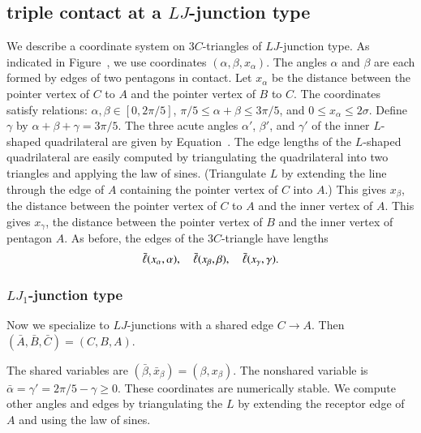 \subsection{triple contact at a $LJ$-junction type}

We describe a coordinate system on $3C$-triangles of $LJ$-junction
type.  As indicated in Figure~, we use coordinates
$(\alpha,\beta,x_\alpha)$.  The angles $\alpha$ and $\beta$ are each
formed by edges of two pentagons in contact.  Let $x_\alpha$ be the
distance between the pointer vertex of $C$ to $A$ and the pointer
vertex of $B$ to $C$.  The coordinates satisfy relations:
$\alpha,\beta\in [0,2\pi/5]$, $\pi/5\le\alpha+\beta\le 3\pi/5$, and
$0\le x_\alpha\le 2\sigma$.  Define $\gamma$ by
$\alpha+\beta+\gamma=3\pi/5$.  The three acute angles $\alpha'$,
$\beta'$, and $\gamma'$ of the inner $L$-shaped quadrilateral are
given by Equation~.  The edge lengths of the $L$-shaped
quadrilateral are easily computed by triangulating the quadrilateral
into two triangles and applying the law of sines.  (Triangulate $L$ by
extending the line through the edge of $A$ containing the pointer
vertex of $C$ into $A$.)  This gives $x_\beta$, the distance between
the pointer vertex of $C$ to $A$ and the inner vertex of $A$.  This
gives $x_\gamma$, the distance between the pointer vertex of $B$ and
the inner vertex of pentagon $A$.  As before, the edges of the
$3C$-triangle have lengths
\[
\bar\ell(x_\alpha,\alpha),\quad \bar\ell(x_\beta,\beta),\quad \bar\ell(x_\gamma,\gamma).
\]


\subsubsection{$LJ_1$-junction type}

Now we specialize to $LJ$-junctions with a shared edge $C\to A$.
Then $(\bar A,\bar B,\bar C)=(C,B,A)$.

The shared variables are $(\bar \beta,\bar x_\beta)=(\beta,x_\beta)$.
The nonshared variable is $\bar\alpha=\gamma' = 2\pi/5-\gamma\ge0$.
These coordinates are numerically stable.  We compute other angles and
edges by triangulating the $L$ by extending the receptor edge of $A$
and using the law of sines.


